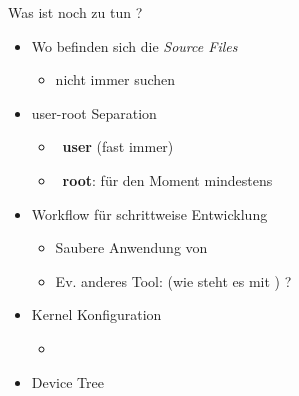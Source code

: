 \documentclass{beamer}
\begin{document}
\begin{frame}{Was ist noch zu tun ?}
 \begin{itemize}
  \item Wo befinden sich die {\em Source Files} 
  \begin{itemize}
   \item nicht immer suchen
  \end{itemize}
  \item user-root Separation
  \begin{itemize}
   \item \host\ {\bf user} (fast immer)
   \item \targetS\ {\bf root}: für den Moment mindestens
  \end{itemize}
  \item Workflow für schrittweise Entwicklung
  \begin{itemize}
   \item Saubere Anwendung von 
   \item Ev. anderes Tool: (wie steht es mit ) ?
  \end{itemize}
  \item Kernel Konfiguration
  \begin{itemize}
   \item {}  
  \end{itemize}
  \item Device Tree
 \end{itemize}
\end{frame}
\end{document}

